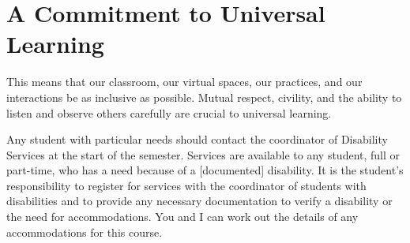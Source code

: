 \section{A Commitment to Universal Learning}
 This means that our classroom, our virtual spaces, our practices, and our interactions be as inclusive as possible. Mutual respect, civility, and the ability to listen and observe others carefully are crucial to universal learning.

Any student with particular needs should contact the coordinator of Disability Services at the start of the semester. Services are available to any student, full or part-time, who has a need because of a [documented] disability. It is the student's responsibility to register for services with the coordinator of students with disabilities and to provide any necessary documentation to verify a disability or the need for accommodations.  You and I can work out the details of any accommodations for this course.